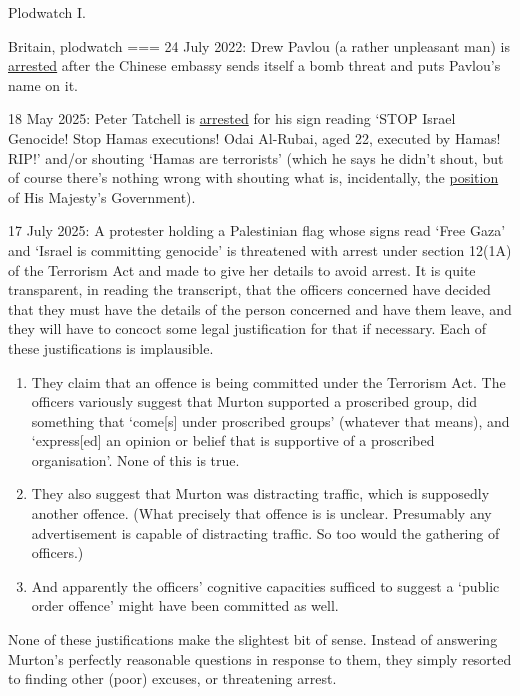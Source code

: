 Plodwatch I.

Britain, plodwatch
===
24 July 2022: Drew Pavlou (a rather unpleasant man) is \href{https://www.theguardian.com/australia-news/2022/jul/23/australian-activist-drew-pavlou-arrested-in-london-but-denies-sending-chinese-embassy-bomb-threat}{arrested} after the Chinese embassy sends itself a bomb threat and puts Pavlou’s name on it.

18 May 2025: Peter Tatchell is \href{https://www.petertatchellfoundation.org/peter-tatchell-arrested-at-palestine-protest-on-fake-charges/}{arrested} for his sign reading ‘STOP Israel Genocide! Stop Hamas executions! Odai Al-Rubai, aged 22, executed by Hamas! RIP!’ and/or shouting ‘Hamas are terrorists’ (which he says he didn’t shout, but of course there’s nothing wrong with shouting what is, incidentally, the \href{https://www.legislation.gov.uk/uksi/2021/1318/article/2/made}{position} of His Majesty’s Government).

17 July 2025: A protester holding a Palestinian flag whose signs read ‘Free Gaza’ and ‘Israel is committing genocide’ is threatened with arrest under section 12(1A) of the Terrorism Act and made to give her details to avoid arrest. 
It is quite transparent, in reading the transcript, that the officers concerned have decided that they must have the details of the person concerned and have them leave, and they will have to concoct some legal justification for that if necessary. Each of these justifications is implausible.
\begin{enumerate}
    \item They claim that an offence is being committed under the Terrorism Act. The officers variously suggest that Murton supported a proscribed group, did something that ‘come[s] under proscribed groups’ (whatever that means), and ‘express[ed] an opinion or belief that is supportive of a proscribed organisation’. None of this is true.
    \item They also suggest that Murton was distracting traffic, which is supposedly another offence. (What precisely that offence is is unclear. Presumably any advertisement is capable of distracting traffic. So too would the gathering of officers.)
    \item And apparently the officers’ cognitive capacities sufficed to suggest a ‘public order offence’ might have been committed as well.
\end{enumerate}
None of these justifications make the slightest bit of sense. Instead of answering Murton’s perfectly reasonable questions in response to them, they simply resorted to finding other (poor) excuses, or threatening arrest.

